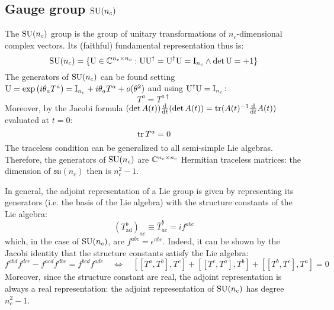 \subsection{Gauge group \texorpdfstring{$ \mathrm{SU}(n_c) $}{SU(n)}}

The $ \mathrm{SU}(n_c) $ group is the group of unitary transformations of $ n_c $-dimensional complex vectors. Its (faithful) fundamental representation thus is:
\begin{equation*}
  \mathrm{SU}(n_c) = \{\mathrm{U} \in \mathbb{C}^{n_c \times n_c} : \mathrm{U}\mathrm{U}^\dagger = \mathrm{U}^\dagger\mathrm{U} = \mathrm{I}_{n_c} \land \det{\mathrm{U}} = +1 \}
\end{equation*}
The generators of $ \mathrm{SU}(n_c) $ can be found setting $ \mathrm{U} = \exp \left( i \theta_a T^a \right) = \mathrm{I}_{n_c} + i \theta_a T^a + o(\theta^2) $ and using $ \mathrm{U}^\dagger\mathrm{U} = \mathrm{I}_{n_c} $:
\begin{equation}
  T^a = T^{a\dagger}
  \label{eq:sun-herm}
\end{equation}
Moreover, by the Jacobi formula $ (\det A(t)) \frac{\mathrm{d}}{\mathrm{d} t} (\det A(t)) = \operatorname{tr} (A(t)^{-1} \frac{\mathrm{d}}{\mathrm{d} t} A(t)) $ evaluated at $ t = 0 $:
\begin{equation}
  \operatorname{tr} T^a = 0
  \label{eq:sun-trace}
\end{equation}
The traceless condition can be generalized to all semi-simple Lie algebras.
Therefore, the generators of $ \mathrm{SU}(n_c) $ are $ \mathbb{C}^{n_c \times n_c} $ Hermitian traceless matrices: the dimension of $ \mathfrak{su}(n_c) $ then is $ n_c^2 - 1 $.

In general, the adjoint representation of a Lie group is given by representing its generators (i.e. the basis of the Lie algebra) with the structure constants of the Lie algebra:
\begin{equation}
  (T^b_\text{ad})_{ac} \equiv \bar{T}^b_{ac} = i f^{abc}
\end{equation}
which, in the case of $ \mathrm{SU}(n_c) $, are $ f^{abc} = \epsilon^{abc} $. Indeed, it can be shown by the Jacobi identity that the structure constants satisfy the Lie algebra:
\begin{equation*}
  f^{abd} f^{dce} - f^{acd} f^{dbe} = f^{bcd} f^{ade}
  \quad \iff \quad
  [[T^a,T^b],T^c] + [[T^c,T^a],T^b] + [[T^b,T^c],T^a] = 0
\end{equation*}
Moreover, since the structure constant are real, the adjoint representation is always a real representation: the adjoint representation of $ \mathrm{SU}(n_c) $ has degree $ n_c^2 - 1 $.

